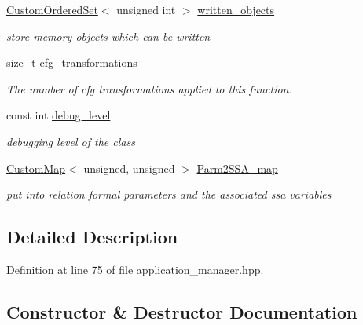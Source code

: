 \begin{DoxyCompactItemize}
\hyperlink{classCustomOrderedSet}{Custom\+Ordered\+Set}$<$ unsigned int $>$ \hyperlink{classapplication__manager_a5bb93bca164a497e970fec39ec1999dc}{written\+\_\+objects}
\begin{DoxyCompactList}\small\item\em store memory objects which can be written \end{DoxyCompactList}\item 
\hyperlink{tutorial__fpt__2017_2intro_2sixth_2test_8c_a7c94ea6f8948649f8d181ae55911eeaf}{size\+\_\+t} \hyperlink{classapplication__manager_a0cf119f23655908b2699affebfcf109b}{cfg\+\_\+transformations}
\begin{DoxyCompactList}\small\item\em The number of cfg transformations applied to this function. \end{DoxyCompactList}\item 
const int \hyperlink{classapplication__manager_aa9ca2ad41798ce33f8f96f3e4f035756}{debug\+\_\+level}
\begin{DoxyCompactList}\small\item\em debugging level of the class \end{DoxyCompactList}\item 
\hyperlink{custom__map_8hpp_a18ca01763abbe3e5623223bfe5aaac6b}{Custom\+Map}$<$ unsigned, unsigned $>$ \hyperlink{classapplication__manager_a0e3aa4f0a01efa15c802541758b587c9}{Parm2\+S\+S\+A\+\_\+map}
\begin{DoxyCompactList}\small\item\em put into relation formal parameters and the associated ssa variables \end{DoxyCompactList}\end{DoxyCompactItemize}


\subsection{Detailed Description}


Definition at line 75 of file application\+\_\+manager.\+hpp.



\subsection{Constructor \& Destructor Documentation}
\mbox{\label{classapplication__manager_a8940a0e1914fdefcf70357a5fc2efdfb}} 

